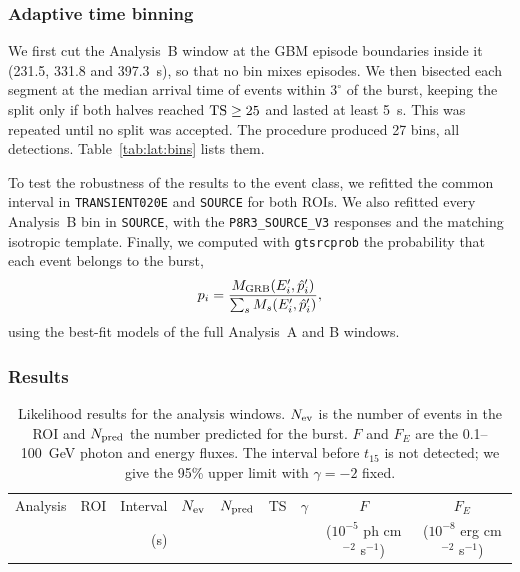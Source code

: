 \subsubsection{Adaptive time binning}
\label{sec:lat:bins}

We first cut the Analysis~B window at the GBM episode boundaries inside it (231.5, 331.8 and 397.3~s), so that
no bin mixes episodes. We then bisected each segment at the median arrival time of events within $3^\circ$ of the
burst, keeping the split only if both halves reached ${\rm TS} \ge 25$ and lasted at least 5~s. This was
repeated until no split was accepted. The procedure produced 27 bins, all detections. Table~\ref{tab:lat:bins}
lists them.

To test the robustness of the results to the event class, we refitted the common interval in
\texttt{TRANSIENT020E} and \texttt{SOURCE} for both ROIs. We also refitted every Analysis~B bin in \texttt{SOURCE},
with the \texttt{P8R3\_SOURCE\_V3} responses and the matching isotropic template. Finally, we computed with
\texttt{gtsrcprob} the probability that each event belongs to the burst,
\begin{equation}
  p_i = \frac{M_{\rm GRB}(E'_i, \hat{p}'_i)}{\sum_s M_s(E'_i, \hat{p}'_i)},
  \label{eq:prob}
\end{equation}
using the best-fit models of the full Analysis~A and B windows.

\subsubsection{Results}
\label{sec:lat:results}

\begin{table}
  \centering
  \caption{Likelihood results for the analysis windows. $N_{\rm ev}$ is the number of events in the ROI and
  $N_{\rm pred}$ the number predicted for the burst. $F$ and $F_E$ are the 0.1--100~GeV photon and energy fluxes.
  The interval before $t_{15}$ is not detected; we give the 95\% upper limit with $\gamma=-2$ fixed.}
  \label{tab:lat:windows}
  \begin{tabular}{llrrrrccc}
    \hline
    Analysis & ROI & Interval & $N_{\rm ev}$ & $N_{\rm pred}$ & TS & $\gamma$ & $F$ & $F_E$ \\
     & & (s) & & & & & ($10^{-5}$ ph cm$^{-2}$ s$^{-1}$) & ($10^{-8}$ erg cm$^{-2}$ s$^{-1}$) \\
    \hline
    
  \end{tabular}
\end{table}

